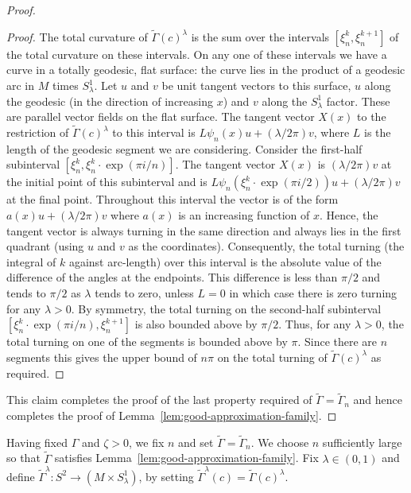 \begin{proof}
\begin{proof}
The total curvature of $\widetilde \Gamma(c)^\lambda$ is the sum
over the intervals $[\xi_n^k,\xi_n^{k+1}]$ of the total curvature on
these intervals. On any one of these intervals we have a curve in a
totally geodesic, flat surface: the curve lies in the product of a
geodesic arc in $M$ times $S^1_\lambda$. Let $u$ and $v$ be unit
tangent vectors to this surface, $u$ along the geodesic (in the
direction of increasing $x$) and $v$ along the $S^1_\lambda$ factor.
These are parallel vector fields on the flat surface.
 The tangent
vector $X(x)$ to the restriction of $\widetilde \Gamma(c)^\lambda$
to this interval is $L\psi_n(x) u+(\lambda/2\pi)v$, where $L$ is the
length of the geodesic segment we are considering. Consider the
first-half subinterval $[\xi_n^k,\xi_n^k\cdot\exp(\pi i/n)]$.
The tangent vector $X(x)$ is $(\lambda/2\pi) v$ at the initial point
of this subinterval and is $L\psi_n(\xi_n^k\cdot\exp(\pi
i/2))u+(\lambda/2\pi) v$ at the final point. Throughout this
interval the vector is of the form $a(x)u+(\lambda/2\pi) v$ where
$a(x)$ is an increasing function of $x$. Hence, the tangent vector
is always turning in the same direction and always lies in the first
quadrant (using $u$ and $v$ as the coordinates). Consequently, the
total turning (the integral of $k$ against arc-length) over this
interval is the absolute value of the difference of the angles at
the endpoints. This difference is less than $\pi/2$ and tends to
$\pi/2$ as $\lambda$ tends to zero, unless $L=0$ in which case there
is zero turning for any $\lambda>0$. By symmetry, the total turning
on the second-half subinterval $[\xi_n^k\cdot\exp(\pi
i/n),\xi_n^{k+1}]$ is also bounded above by $\pi/2$. Thus, for any
$\lambda>0$, the total turning on one of the segments is bounded
above by $\pi$. Since there are $n$ segments this gives the upper
bound of $n\pi$ on the total turning of $\widetilde
\Gamma(c)^\lambda$ as required.
\end{proof}

This claim completes the proof of the last property required of
$\widetilde\Gamma=\widetilde \Gamma_n$ and hence completes the proof
of Lemma~\ref{lem:good-approximation-family}.
\end{proof}

Having fixed $\Gamma$ and $\zeta>0$, we fix $n$ and set
$\widetilde\Gamma=\widetilde \Gamma_n$. We choose $n$ sufficiently
large so that $\widetilde \Gamma$ satisfies Lemma~\ref{lem:good-approximation-family}.
 Fix $\lambda\in (0,1)$ and
define $\widetilde \Gamma^\lambda\colon S^2\to (M\times S^1_\lambda)$, by
setting $\widetilde \Gamma^\lambda(c)=\widetilde \Gamma(c)^\lambda$.

